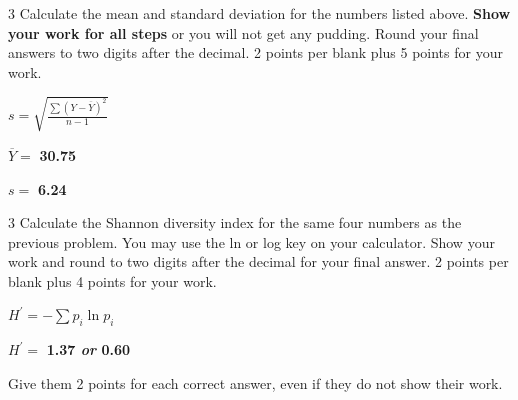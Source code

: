 \showpoints


\question[9]
\begin{multicols}{3}
Calculate the mean and standard deviation for the numbers listed above.
\textbf{Show your work for all steps} or you will not get any pudding. Round your final answers to two digits after the decimal.
2 points per blank plus 5 points for your work. 

\columnbreak

\hfil $ s = \sqrt{\frac{\sum{(Y-\overline{Y})^2}}{n-1}} $ \hfill


\columnbreak

$\overline{Y}=$ \ifprintanswers \textbf{30.75} \else \AnswerBlank \fi

\vspace*{2\baselineskip}

$s = $ \ifprintanswers\textbf{6.24} \else \AnswerBlank \fi


\end{multicols}

\newpage

\question[6]
\begin{multicols}{3}
Calculate the Shannon diversity index for the same four numbers as the previous problem. 
You may use the ln or log key on your calculator. 
Show your work and round to two digits after the decimal for your final answer. 
2 points per blank plus 4 points for your work. 


\columnbreak

\hfil $ H^\prime = -\sum{p_i \ln p_i} $ \hfill

\columnbreak

$H^\prime=$ \ifprintanswers \textbf{1.37 \emph{or} 0.60} \else \AnswerBlank \fi


\end{multicols}

\begin{solution}

Give them 2 points for each correct answer, even if they do not show their work. 

\end{solution}
